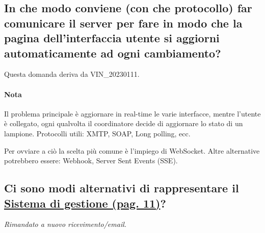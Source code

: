 \subsection*{In che modo conviene (con che protocollo) far comunicare il server per fare in modo che la pagina dell'interfaccia utente si aggiorni automaticamente ad ogni cambiamento?}

Questa domanda deriva da VIN\_20230111.

\paragraph{Nota} Il problema principale è aggiornare in real-time le varie interfacce, mentre l'utente è collegato, ogni qualvolta il coordinatore decide di aggiornare lo stato di un lampione. Protocolli utili: XMTP, SOAP, Long polling, ecc.

Per ovviare a ciò la scelta più comune è l'impiego di WebSocket. Altre alternative potrebbero essere: Webhook, Server Sent Events (SSE).

\subsection*{Ci sono modi alternativi di rappresentare il \href{https://github.com/SWEasabi/analisi-dei-requisiti/blob/69fd3970d6618d506a725d9a7cd83afa3417eed1/src-doc/contenuti/img/casi_uso_grafici-applicazione\%2Cgestione.png}{Sistema di gestione (pag. 11)}?}

\emph{Rimandato a nuovo ricevimento/email.}